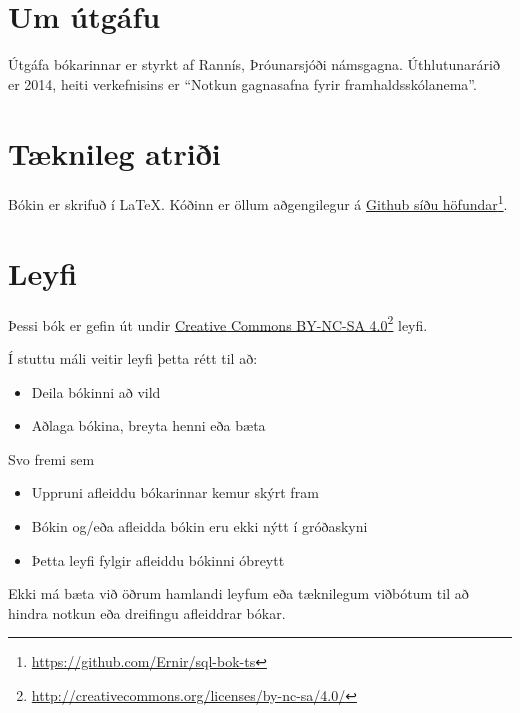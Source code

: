 \section{Um útgáfu}
Útgáfa bókarinnar er styrkt af Rannís, Þróunarsjóði námsgagna. Úthlutunarárið er 2014, heiti verkefnisins er ``Notkun gagnasafna fyrir framhaldsskólanema''.
\section{Tæknileg atriði}
Bókin er skrifuð í \LaTeX. Kóðinn er öllum aðgengilegur á \href{https://github.com/Ernir/sql-bok-ts}{Github síðu höfundar}\footnote{\url{https://github.com/Ernir/sql-bok-ts}}.
\section{Leyfi}
Þessi bók er gefin út undir \href{http://creativecommons.org/licenses/by-nc-sa/4.0/}{Creative Commons BY-NC-SA 4.0}\footnote{\url{http://creativecommons.org/licenses/by-nc-sa/4.0/}} leyfi. 

Í stuttu máli veitir leyfi þetta rétt til að:
\begin{itemize}
 \item Deila bókinni að vild
 \item Aðlaga bókina, breyta henni eða bæta
\end{itemize}
Svo fremi sem
\begin{itemize}
 \item Uppruni afleiddu bókarinnar kemur skýrt fram
 \item Bókin og/eða afleidda bókin eru ekki nýtt í gróðaskyni
 \item Þetta leyfi fylgir afleiddu bókinni óbreytt
\end{itemize}
Ekki má bæta við öðrum hamlandi leyfum eða tæknilegum viðbótum til að hindra notkun eða dreifingu afleiddrar bókar.